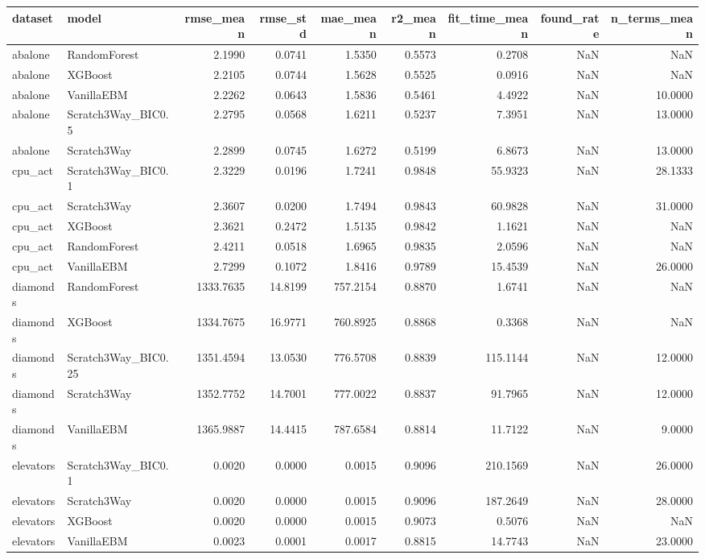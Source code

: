\begin{tabular}{llrrrrrrr}
\toprule
dataset & model & rmse_mean & rmse_std & mae_mean & r2_mean & fit_time_mean & found_rate & n_terms_mean \\
\midrule
abalone & RandomForest & 2.1990 & 0.0741 & 1.5350 & 0.5573 & 0.2708 & NaN & NaN \\
abalone & XGBoost & 2.2105 & 0.0744 & 1.5628 & 0.5525 & 0.0916 & NaN & NaN \\
abalone & VanillaEBM & 2.2262 & 0.0643 & 1.5836 & 0.5461 & 4.4922 & NaN & 10.0000 \\
abalone & Scratch3Way_BIC0.5 & 2.2795 & 0.0568 & 1.6211 & 0.5237 & 7.3951 & NaN & 13.0000 \\
abalone & Scratch3Way & 2.2899 & 0.0745 & 1.6272 & 0.5199 & 6.8673 & NaN & 13.0000 \\
cpu_act & Scratch3Way_BIC0.1 & 2.3229 & 0.0196 & 1.7241 & 0.9848 & 55.9323 & NaN & 28.1333 \\
cpu_act & Scratch3Way & 2.3607 & 0.0200 & 1.7494 & 0.9843 & 60.9828 & NaN & 31.0000 \\
cpu_act & XGBoost & 2.3621 & 0.2472 & 1.5135 & 0.9842 & 1.1621 & NaN & NaN \\
cpu_act & RandomForest & 2.4211 & 0.0518 & 1.6965 & 0.9835 & 2.0596 & NaN & NaN \\
cpu_act & VanillaEBM & 2.7299 & 0.1072 & 1.8416 & 0.9789 & 15.4539 & NaN & 26.0000 \\
diamonds & RandomForest & 1333.7635 & 14.8199 & 757.2154 & 0.8870 & 1.6741 & NaN & NaN \\
diamonds & XGBoost & 1334.7675 & 16.9771 & 760.8925 & 0.8868 & 0.3368 & NaN & NaN \\
diamonds & Scratch3Way_BIC0.25 & 1351.4594 & 13.0530 & 776.5708 & 0.8839 & 115.1144 & NaN & 12.0000 \\
diamonds & Scratch3Way & 1352.7752 & 14.7001 & 777.0022 & 0.8837 & 91.7965 & NaN & 12.0000 \\
diamonds & VanillaEBM & 1365.9887 & 14.4415 & 787.6584 & 0.8814 & 11.7122 & NaN & 9.0000 \\
elevators & Scratch3Way_BIC0.1 & 0.0020 & 0.0000 & 0.0015 & 0.9096 & 210.1569 & NaN & 26.0000 \\
elevators & Scratch3Way & 0.0020 & 0.0000 & 0.0015 & 0.9096 & 187.2649 & NaN & 28.0000 \\
elevators & XGBoost & 0.0020 & 0.0000 & 0.0015 & 0.9073 & 0.5076 & NaN & NaN \\
elevators & VanillaEBM & 0.0023 & 0.0001 & 0.0017 & 0.8815 & 14.7743 & NaN & 23.0000 \\

\end{tabular}

